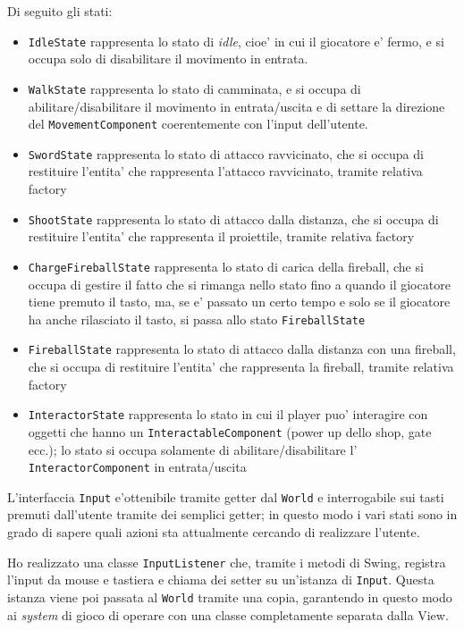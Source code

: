 \documentclass[a4paper,12pt]{report}
\begin{document}
Di seguito gli stati:
\begin{itemize}
	\item \texttt{IdleState} rappresenta lo stato di \textit{idle}, cioe' in cui il giocatore e' fermo, e si occupa solo di disabilitare il movimento in entrata.
	\item \texttt{WalkState} rappresenta lo stato di camminata, e si occupa di abilitare/disabilitare il movimento in entrata/uscita e di settare la direzione del \texttt{MovementComponent} coerentemente con l'input dell'utente.
	\item \texttt{SwordState} rappresenta lo stato di attacco ravvicinato, che si occupa di restituire l'entita' che rappresenta l'attacco ravvicinato, tramite relativa factory
	\item \texttt{ShootState} rappresenta lo stato di attacco dalla distanza, che si occupa di restituire l'entita' che rappresenta il proiettile, tramite relativa factory
	\item \texttt{ChargeFireballState} rappresenta lo stato di carica della fireball, che si occupa di gestire il fatto che si rimanga nello stato fino a quando il giocatore tiene premuto il tasto, ma, se e' passato un certo tempo e solo se il giocatore ha anche rilasciato il tasto, si passa allo stato \texttt{FireballState}
	\item \texttt{FireballState} rappresenta lo stato di attacco dalla distanza con una fireball, che si occupa di restituire l'entita' che rappresenta la fireball, tramite relativa factory
	\item \texttt{InteractorState} rappresenta lo stato in cui il player puo' interagire con oggetti che hanno un \texttt{InteractableComponent} (power up dello shop, gate ecc.); lo stato si occupa solamente di abilitare/disabilitare l' \texttt{InteractorComponent} in entrata/uscita
\end{itemize}

L'interfaccia \texttt{Input} e'ottenibile tramite getter dal \texttt{World} e interrogabile sui tasti premuti dall'utente tramite dei semplici getter; in questo modo i vari stati sono in grado di sapere quali azioni sta attualmente cercando di realizzare l'utente.

Ho realizzato una classe \texttt{InputListener} che, tramite i metodi di Swing, registra l'input da mouse e tastiera e chiama dei setter su un'istanza di \texttt{Input}. Questa istanza viene poi passata al \texttt{World} tramite una copia, garantendo in questo modo ai \textit{system} di gioco di operare con una classe completamente separata dalla View.
\end{document}

